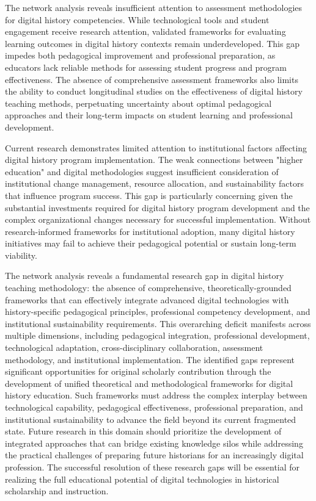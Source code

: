 The network analysis reveals insufficient attention to assessment methodologies for digital history competencies. While technological tools and student engagement receive research attention, validated frameworks for evaluating learning outcomes in digital history contexts remain underdeveloped. This gap impedes both pedagogical improvement and professional preparation, as educators lack reliable methods for assessing student progress and program effectiveness.
The absence of comprehensive assessment frameworks also limits the ability to conduct longitudinal studies on the effectiveness of digital history teaching methods, perpetuating uncertainty about optimal pedagogical approaches and their long-term impacts on student learning and professional development.

Current research demonstrates limited attention to institutional factors affecting digital history program implementation. The weak connections between "higher education" and digital methodologies suggest insufficient consideration of institutional change management, resource allocation, and sustainability factors that influence program success.
This gap is particularly concerning given the substantial investments required for digital history program development and the complex organizational changes necessary for successful implementation. Without research-informed frameworks for institutional adoption, many digital history initiatives may fail to achieve their pedagogical potential or sustain long-term viability.

The network analysis reveals a fundamental research gap in digital history teaching methodology: the absence of comprehensive, theoretically-grounded frameworks that can effectively integrate advanced digital technologies with history-specific pedagogical principles, professional competency development, and institutional sustainability requirements. This overarching deficit manifests across multiple dimensions, including pedagogical integration, professional development, technological adaptation, cross-disciplinary collaboration, assessment methodology, and institutional implementation.
The identified gaps represent significant opportunities for original scholarly contribution through the development of unified theoretical and methodological frameworks for digital history education. Such frameworks must address the complex interplay between technological capability, pedagogical effectiveness, professional preparation, and institutional sustainability to advance the field beyond its current fragmented state.
Future research in this domain should prioritize the development of integrated approaches that can bridge existing knowledge silos while addressing the practical challenges of preparing future historians for an increasingly digital profession. The successful resolution of these research gaps will be essential for realizing the full educational potential of digital technologies in historical scholarship and instruction.



